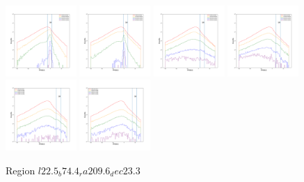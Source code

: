 \documentclass[12pt,prd]{article}
\begin{document}
\begin{figure}[h!]
\includegraphics[width=0.24\textwidth]{../figures/scanning_plotsgaiascan_l22_5_b74_4_ra209_6_dec23_3_npy_12.pdf}
\includegraphics[width=0.24\textwidth]{../figures/scanning_plotsgaiascan_l22_5_b74_4_ra209_6_dec23_3_npy_13.pdf}
\includegraphics[width=0.24\textwidth]{../figures/scanning_plotsgaiascan_l22_5_b74_4_ra209_6_dec23_3_npy_14.pdf}
\includegraphics[width=0.24\textwidth]{../figures/scanning_plotsgaiascan_l22_5_b74_4_ra209_6_dec23_3_npy_15.pdf}
\includegraphics[width=0.24\textwidth]{../figures/scanning_plotsgaiascan_l22_5_b74_4_ra209_6_dec23_3_npy_16.pdf}
\includegraphics[width=0.24\textwidth]{../figures/scanning_plotsgaiascan_l22_5_b74_4_ra209_6_dec23_3_npy_17.pdf}
\caption{Region $l22.5_b74.4_ra209.6_dec23.3$}
\end{figure}
\end{document}

